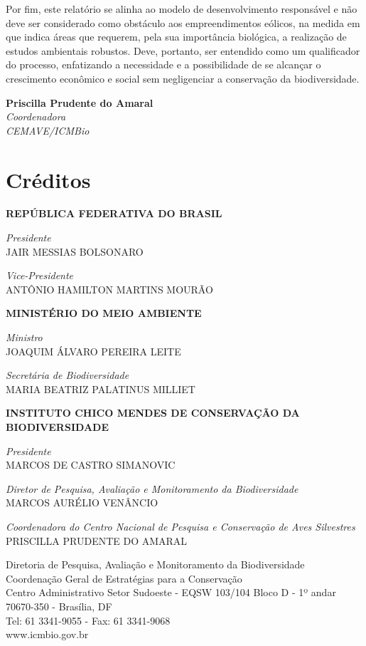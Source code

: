 \documentclass[
  oneside]{scrbook}
\begin{document}
Por fim, este relatório se alinha ao modelo de desenvolvimento responsável e não deve ser considerado como obstáculo aos empreendimentos eólicos, na medida em que indica áreas que requerem, pela sua importância biológica, a realização de estudos ambientais robustos. Deve, portanto, ser entendido como um qualificador do processo, enfatizando a necessidade e a possibilidade de se alcançar o crescimento econômico e social sem negligenciar a conservação da biodiversidade.

\textbf{Priscilla Prudente do Amaral}\\
\emph{Coordenadora}\\
\emph{CEMAVE/ICMBio}

\hypertarget{creditos}{%
\chapter*{Créditos}\label{creditos}}

\textbf{REPÚBLICA FEDERATIVA DO BRASIL}

\emph{Presidente}\\
JAIR MESSIAS BOLSONARO

\emph{Vice-Presidente}\\
ANTÔNIO HAMILTON MARTINS MOURÃO

\textbf{MINISTÉRIO DO MEIO AMBIENTE}

\emph{Ministro}\\
JOAQUIM ÁLVARO PEREIRA LEITE

\emph{Secretária de Biodiversidade}\\
MARIA BEATRIZ PALATINUS MILLIET

\textbf{INSTITUTO CHICO MENDES DE CONSERVAÇÃO DA BIODIVERSIDADE}

\emph{Presidente}\\
MARCOS DE CASTRO SIMANOVIC

\emph{Diretor de Pesquisa, Avaliação e Monitoramento da Biodiversidade}\\
MARCOS AURÉLIO VENÂNCIO

\emph{Coordenadora do Centro Nacional de Pesquisa e Conservação de Aves Silvestres}\\
PRISCILLA PRUDENTE DO AMARAL

Diretoria de Pesquisa, Avaliação e Monitoramento da Biodiversidade\\
Coordenação Geral de Estratégias para a Conservação\\
Centro Administrativo Setor Sudoeste - EQSW 103/104 Bloco D - 1º andar\\
70670-350 - Brasília, DF\\
Tel: 61 3341-9055 - Fax: 61 3341-9068\\
www.icmbio.gov.br
\end{document}
